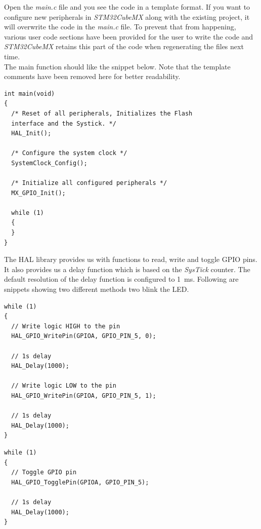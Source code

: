 \documentclass[a4paper,12pt,oneside]{book}
\begin{document}
\bigskip

Open the \textit{main.c} file and you see the code in a template format. If you want to configure new peripherals in \textit{STM32CubeMX} along with the existing project, it will overwrite the code in the \textit{main.c} file. To prevent that from happening, various user code sections have been provided for the user to write the code and \textit{STM32CubeMX} retains this part of the code when regenerating the files next time.\\

The main function should like the snippet below. Note that the template comments have been removed here for better readability.\\

\begin{verbatim}
int main(void)
{
  /* Reset of all peripherals, Initializes the Flash 
  interface and the Systick. */
  HAL_Init();

  /* Configure the system clock */
  SystemClock_Config();

  /* Initialize all configured peripherals */
  MX_GPIO_Init();

  while (1)
  {
  }
}
\end{verbatim}

\bigskip
\bigskip

The HAL library provides us with functions to read, write and toggle GPIO pins. It also provides us a delay function which is based on the \textit{SysTick} counter. The default resolution of the delay function is configured to \SI{1}{\milli\second}. Following are snippets showing two different methods two blink the LED.\\

\begin{verbatim}
while (1)
{
  // Write logic HIGH to the pin
  HAL_GPIO_WritePin(GPIOA, GPIO_PIN_5, 0);
  
  // 1s delay
  HAL_Delay(1000);
  
  // Write logic LOW to the pin
  HAL_GPIO_WritePin(GPIOA, GPIO_PIN_5, 1);
  
  // 1s delay
  HAL_Delay(1000);
}
\end{verbatim}

\clearpage

\begin{verbatim}
while (1)
{
  // Toggle GPIO pin
  HAL_GPIO_TogglePin(GPIOA, GPIO_PIN_5);
  
  // 1s delay
  HAL_Delay(1000);
}
\end{verbatim}
\end{document}
